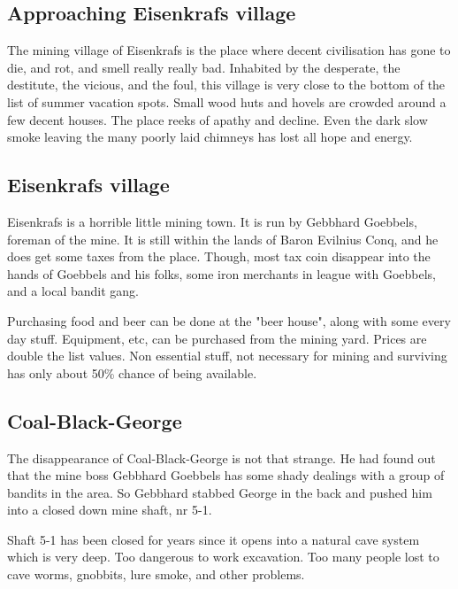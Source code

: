 \subsection*{Approaching Eisenkrafs village}
\begin{readoutloud}
The mining village of Eisenkrafs is the place where decent civilisation has gone to die, and rot, and smell really really bad. Inhabited by the desperate, the destitute, the vicious, and the foul, this village is very close to the bottom of the list of summer vacation spots. Small wood huts and hovels are crowded around a few decent houses. The place reeks of apathy and decline. Even the dark slow smoke leaving the many poorly laid chimneys has lost all hope and energy.
\end{readoutloud}


\subsection*{Eisenkrafs village}
Eisenkrafs is a horrible little mining town. It is run by Gebbhard Goebbels, foreman of the mine. It is still within the lands of Baron Evilnius Conq, and he does get some taxes from the place. Though, most tax coin disappear into the hands of Goebbels and his folks, some iron merchants in league with Goebbels, and a local bandit gang.

Purchasing food and beer can be done at the "beer house", along with some every day stuff. Equipment, etc, can be purchased from the mining yard. Prices are double the list values. Non essential stuff, not necessary for mining and surviving has only about 50\% chance of being available.


\subsection*{Coal-Black-George}
The disappearance of Coal-Black-George is not that strange. He had found out that the mine boss Gebbhard Goebbels has some shady dealings with a group of bandits in the area. So Gebbhard stabbed George in the back and pushed him into a closed down mine shaft, nr 5-1.

Shaft 5-1 has been closed for years since it opens into a natural cave system which is very deep. Too dangerous to work excavation. Too many people lost to cave worms, gnobbits, lure smoke, and other problems.


